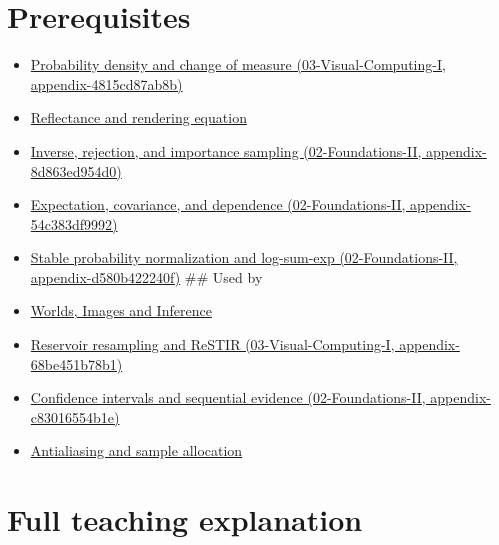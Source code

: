 \section{Prerequisites}\label{appendix-031e02bf28af-prerequisites}

\begin{itemize}
\item
  \href{../03-Visual-Computing-I/main.pdf\#nameddest=appendix-4815cd87ab8b}{Probability density and change of measure (03-Visual-Computing-I, appendix-4815cd87ab8b)}
\item
  \hyperref[appendix-96da0b153b77]{Reflectance and rendering equation}
\item
  \href{../02-Foundations-II/main.pdf\#nameddest=appendix-8d863ed954d0}{Inverse, rejection, and importance sampling (02-Foundations-II, appendix-8d863ed954d0)}
\item
  \href{../02-Foundations-II/main.pdf\#nameddest=appendix-54c383df9992}{Expectation, covariance, and dependence (02-Foundations-II, appendix-54c383df9992)}
\item
  \href{../02-Foundations-II/main.pdf\#nameddest=appendix-d580b422240f}{Stable probability normalization and log-sum-exp (02-Foundations-II, appendix-d580b422240f)} \#\# Used by
\item
  \href{Continuous\%20Notes/University\%20-\%20Worlds,\%20Images\%20and\%20Inference\%20-\%20Graphics,\%20Vision\%20and\%20Photography}{Worlds, Images and Inference}
\item
  \href{../03-Visual-Computing-I/main.pdf\#nameddest=appendix-68be451b78b1}{Reservoir resampling and ReSTIR (03-Visual-Computing-I, appendix-68be451b78b1)}
\item
  \href{../02-Foundations-II/main.pdf\#nameddest=appendix-c83016554b1e}{Confidence intervals and sequential evidence (02-Foundations-II, appendix-c83016554b1e)}
\item
  \hyperref[appendix-4192b2bdd21e]{Antialiasing and sample allocation}
\end{itemize}

\section{Full teaching explanation}\label{appendix-031e02bf28af-full-teaching-explanation}

